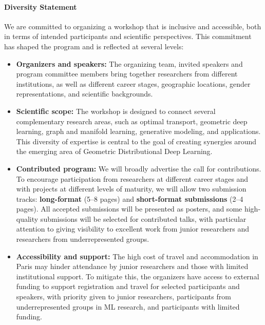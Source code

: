 \documentclass{article}
\begin{document}
\paragraph{Diversity Statement} 
We are committed to organizing a workshop that is inclusive and accessible, both in terms of intended participants and scientific perspectives. This commitment has shaped the program and is reflected at several levels: 
\begin{itemize}[leftmargin=6mm]
    \item \textbf{Organizers and speakers:} The organizing team, invited speakers and program committee members bring together researchers from different institutions, as well as different career stages, geographic locations, gender representations, and scientific backgrounds.
    \item \textbf{Scientific scope:} The workshop is designed to connect several complementary research areas, such as optimal transport, geometric deep learning, graph and manifold learning, generative modeling, and applications. This diversity of expertise is central to the goal of creating synergies around the emerging area of Geometric Distributional Deep Learning.
    \item \textbf{Contributed program:} We will broadly advertise the call for contributions. To encourage participation from researchers at different career stages and with projects at different levels of maturity, we will allow two submission tracks: \textbf{long-format} (5--8 pages) and \textbf{short-format submissions} (2--4 pages). All accepted submissions will be presented as posters, and some high-quality submissions will be selected for contributed talks, with particular attention to giving visibility to excellent work from junior researchers and researchers from underrepresented groups.
    \item \textbf{Accessibility and support:} The high cost of travel and accommodation in Paris may hinder attendance by junior researchers and those with limited institutional support. To mitigate this, the organizers have access to external funding to support registration and travel for selected participants and speakers, with priority given to junior researchers, participants from underrepresented groups in ML research, and participants with limited funding.
\end{itemize}
\end{document}
